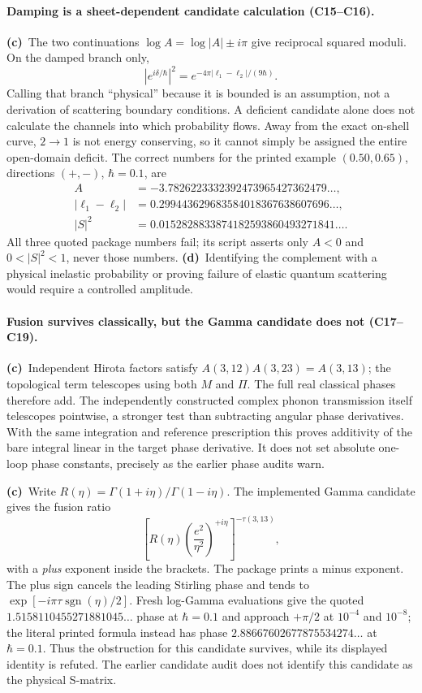 \documentclass[11pt,a4paper]{article}
\newcommand{\Lc}{\textbf{(c)}\ }
\newcommand{\Ld}{\textbf{(d)}\ }
\begin{document}
\paragraph{Damping is a sheet-dependent candidate calculation (C15--C16).}
\Lc The two continuations $\log A=\log|A|\pm i\pi$ give reciprocal squared
moduli. On the damped branch only,
\[
 |e^{i\delta/\hbar}|^2=e^{-4\pi|\ell_1-\ell_2|/(9\hbar)}.
\]
Calling that branch ``physical'' because it is bounded is an assumption,
not a derivation of scattering boundary conditions. A deficient candidate
alone does not calculate the channels into which probability flows.
Away from the exact on-shell curve, $2\to1$ is not energy conserving, so it
cannot simply be assigned the entire open-domain deficit. The correct
numbers for the printed example $(0.50,0.65)$, directions $(+,-)$,
$\hbar=0.1$, are
\begin{align*}
 A&=-3.7826223332392473965427362479\ldots,\\
 |\ell_1-\ell_2|&=0.299443629683584018367638607696\ldots,\\
 |S|^2&=0.0152828833874182593860493271841\ldots.
\end{align*}
All three quoted package numbers fail; its script asserts only $A<0$ and
$0<|S|^2<1$, never those numbers. \Ld Identifying the complement with a
physical inelastic probability or proving failure of elastic quantum
scattering would require a controlled amplitude.

\paragraph{Fusion survives classically, but the Gamma candidate does not (C17--C19).}
\Lc Independent Hirota factors satisfy
$A(3,12)A(3,23)=A(3,13)$; the topological term telescopes using both $M$ and
$\Pi$. The full real classical phases therefore add. The independently
constructed complex phonon transmission itself telescopes pointwise, a
stronger test than subtracting angular phase derivatives. With the same
integration and reference prescription this proves additivity of the bare
integral linear in the target phase derivative. It does not set absolute
one-loop phase constants, precisely as the earlier phase audits warn.

\Lc Write $R(\eta)=\Gamma(1+i\eta)/\Gamma(1-i\eta)$. The implemented
Gamma candidate gives the fusion ratio
\begin{equation}
 \left[R(\eta)\left(\frac{e^2}{\eta^2}\right)^{+i\eta}
 \right]^{-\tau(3,13)},
 \label{gammafix}
\end{equation}
with a \emph{plus} exponent inside the brackets. The package prints a minus
exponent. The plus sign cancels the leading Stirling phase and tends to
$\exp[-i\pi\tau\operatorname{sgn}(\eta)/2]$. Fresh log-Gamma evaluations give
the quoted $1.5158110455271881045\ldots$ phase at $\hbar=0.1$ and approach
$+\pi/2$ at $10^{-4}$ and $10^{-8}$; the literal printed formula instead has phase
$2.88667602677875534274\ldots$ at $\hbar=0.1$.
Thus the obstruction for this candidate survives, while its displayed
identity is refuted. The earlier candidate audit does not identify this
candidate as the physical S-matrix.
\end{document}
